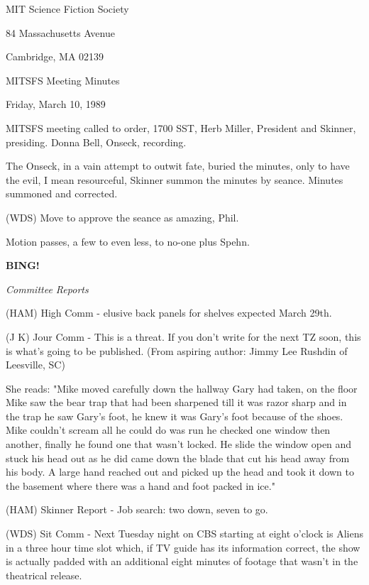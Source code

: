 \documentclass[12pt]{article}
\newcommand{\bing}{{\bf BING!} }
\newcommand{\goto}[1]{\bing \vskip 12pt \centerline{{\em{#1}}}}
\begin{document}
\begin{center}

MIT Science Fiction Society 

84 Massachusetts Avenue

Cambridge, MA 02139

\vspace{12pt}

MITSFS Meeting Minutes 

Friday, March 10, 1989

\end{center}
 
\vspace{18pt}

\setlength{\parskip}{6pt}

\noindent
MITSFS meeting called to order, 1700 SST, Herb Miller, President and Skinner, presiding. Donna Bell, Onseck, recording.

The Onseck, in a vain attempt to outwit fate, buried the minutes, only to have the evil, I mean resourceful, Skinner summon the minutes by seance. Minutes summoned and corrected.

(WDS) Move to approve the seance as amazing, Phil.

Motion passes, a few to even less, to no-one plus Spehn.

\goto{Committee Reports}

(HAM) High Comm - elusive back panels for shelves expected March 29th.

(J K) Jour Comm - This is a threat. If you don't write for the next TZ soon, this is what's going to be published. (From aspiring author: Jimmy Lee Rushdin of Leesville, SC)

She reads: "Mike moved carefully down the hallway Gary had taken, on the floor Mike saw the bear trap that had been sharpened till it was razor sharp and in the trap he saw Gary's foot, he knew it was Gary's foot because of the shoes. Mike couldn't scream all he could do was run he checked one window then another, finally he found one that wasn't locked. He slide the window open and stuck his head out as he did came down the blade that cut his head away from his body. A large hand reached out and picked up the head and took it down to the basement where there was a hand and foot packed in ice."

(HAM) Skinner Report - Job search: two down, seven to go.

(WDS) Sit Comm - Next Tuesday night on CBS starting at eight o'clock is Aliens in a three hour time slot which, if TV guide has its information correct, the show is actually padded with an additional eight minutes of footage that wasn't in the theatrical release.
\end{document}
